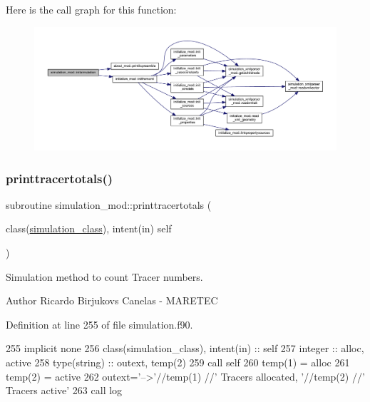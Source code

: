 Here is the call graph for this function\+:\nopagebreak
\begin{figure}[H]
\begin{center}
\leavevmode
\includegraphics[width=350pt]{namespacesimulation__mod_aedbba2bb458cbcd7eb93938a5f7b5940_cgraph}
\end{center}
\end{figure}
\mbox{\label{namespacesimulation__mod_aba126a8e0575cabb3bef6ab395002b3c}} 
\subsubsection{\texorpdfstring{printtracertotals()}{printtracertotals()}}
{\footnotesize\ttfamily subroutine simulation\+\_\+mod\+::printtracertotals (\begin{DoxyParamCaption}\item[{class(\mbox{\hyperlink{structsimulation__mod_1_1simulation__class}{simulation\+\_\+class}}), intent(in)}]{self }\end{DoxyParamCaption})\hspace{0.3cm}{\ttfamily [private]}}



Simulation method to count Tracer numbers. 

\begin{DoxyAuthor}{Author}
Ricardo Birjukovs Canelas -\/ M\+A\+R\+E\+T\+EC 
\end{DoxyAuthor}


Definition at line 255 of file simulation.\+f90.


\begin{DoxyCode}
255     \textcolor{keywordtype}{implicit none}
256     \textcolor{keywordtype}{class}(simulation\_class), \textcolor{keywordtype}{intent(in)} :: self
257     \textcolor{keywordtype}{integer} :: alloc, active
258     \textcolor{keywordtype}{type}(string) :: outext, temp(2)
259     \textcolor{keyword}{call }self%
260     temp(1) = alloc
261     temp(2) = active
262     outext=\textcolor{stringliteral}{'-->'}//temp(1) //\textcolor{stringliteral}{' Tracers allocated, '}//temp(2) //\textcolor{stringliteral}{' Tracers active'}    
263     \textcolor{keyword}{call }log%
\end{DoxyCode}
\mbox{\label{namespacesimulation__mod_a73bd78c4ac76c51f1e10f5847c25c4df}} 
